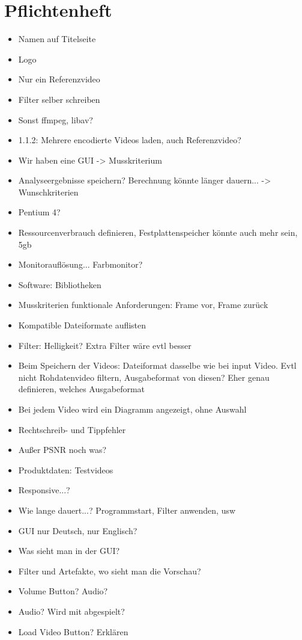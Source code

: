 \documentclass[parskip=full]{scrartcl}
\theoremstyle{mytheor}
\begin{document}
\section{Pflichtenheft}
\begin{itemize}
\item Namen auf Titelseite
\item Logo
\item Nur ein Referenzvideo
\item Filter selber schreiben
\item Sonst ffmpeg, libav?
\item 1.1.2: Mehrere encodierte Videos laden, auch Referenzvideo?
\item Wir haben eine GUI -> Musskriterium
\item Analyseergebnisse speichern? Berechnung könnte länger dauern... -> Wunschkriterien
\item Pentium 4?
\item Ressourcenverbrauch definieren, Festplattenspeicher könnte auch mehr sein, 5gb
\item Monitorauflösung... Farbmonitor?
\item Software: Bibliotheken
\item Musskriterien funktionale Anforderungen: Frame vor, Frame zurück
\item Kompatible Dateiformate auflisten
\item Filter: Helligkeit? Extra Filter wäre evtl besser
\item Beim Speichern der Videos: Dateiformat dasselbe wie bei input Video. Evtl nicht Rohdatenvideo filtern, Ausgabeformat von diesen? Eher genau definieren, welches Ausgabeformat
\item Bei jedem Video wird ein Diagramm angezeigt, ohne Auswahl
\item Rechtschreib- und Tippfehler
\item Außer PSNR noch was?
\item Produktdaten: Testvideos
\item Responsive...?
\item Wie lange dauert...? Programmstart, Filter anwenden, usw
\item GUI nur Deutsch, nur Englisch?
\item Was sieht man in der GUI?
\item Filter und Artefakte, wo sieht man die Vorschau?
\item Volume Button? Audio?
\item Audio? Wird mit abgespielt?
\item Load Video Button? Erklären

\end{itemize}
\end{document}
